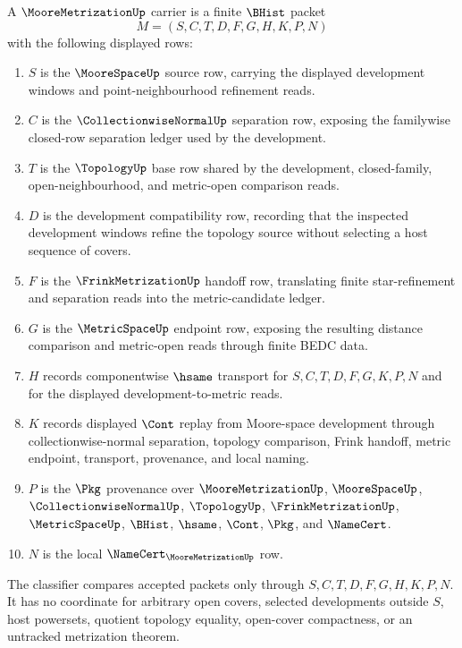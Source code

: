 \begin{definition}
\label{def:moore-metrization-carrier}
A $\MooreMetrizationUp$ carrier is a finite $\BHist$ packet
$$
M=(S,C,T,D,F,G,H,K,P,N)
$$
with the following displayed rows:
\begin{enumerate}
\item $S$ is the $\MooreSpaceUp$ source row, carrying the displayed development windows and point-neighbourhood refinement reads.
\item $C$ is the $\CollectionwiseNormalUp$ separation row, exposing the familywise closed-row separation ledger used by the development.
\item $T$ is the $\TopologyUp$ base row shared by the development, closed-family, open-neighbourhood, and metric-open comparison reads.
\item $D$ is the development compatibility row, recording that the inspected development windows refine the topology source without selecting a host sequence of covers.
\item $F$ is the $\FrinkMetrizationUp$ handoff row, translating finite star-refinement and separation reads into the metric-candidate ledger.
\item $G$ is the $\MetricSpaceUp$ endpoint row, exposing the resulting distance comparison and metric-open reads through finite BEDC data.
\item $H$ records componentwise $\hsame$ transport for $S,C,T,D,F,G,K,P,N$ and for the displayed development-to-metric reads.
\item $K$ records displayed $\Cont$ replay from Moore-space development through collectionwise-normal separation, topology comparison, Frink handoff, metric endpoint, transport, provenance, and local naming.
\item $P$ is the $\Pkg$ provenance over $\MooreMetrizationUp$, $\MooreSpaceUp$, $\CollectionwiseNormalUp$, $\TopologyUp$, $\FrinkMetrizationUp$, $\MetricSpaceUp$, $\BHist$, $\hsame$, $\Cont$, $\Pkg$, and $\NameCert$.
\item $N$ is the local $\NameCert_{\MooreMetrizationUp}$ row.
\end{enumerate}
The classifier compares accepted packets only through $S,C,T,D,F,G,H,K,P,N$. It has no coordinate for arbitrary open covers, selected developments outside $S$, host powersets, quotient topology equality, open-cover compactness, or an untracked metrization theorem.
\end{definition}

